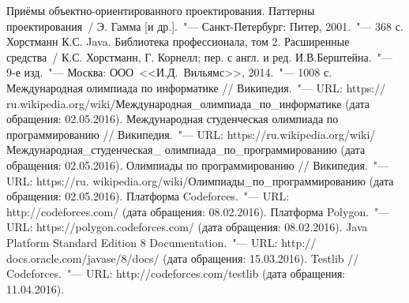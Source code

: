 \renewcommand{\bibname}{Список использованных источников}
\begin{thebibliography}{9}
 Приёмы объектно-ориентированного проектирования. Паттерны проектирования~/ Э. Гамма [и др.].~"--- Санкт-Петербург: Питер, 2001.~"--- 368 с.
 Хорстманн К.С. Java. Библиотека профессионала, том 2. Расширенные средства~/ К.С. Хорстманн, Г. Корнелл; пер. с англ. и ред. И.В.Берштейна.~"--- 9-е изд.~"--- Москва: ООО~<<И.Д.~Вильямс>>, 2014.~"--- 1008 с.
 Международная олимпиада по информатике // Википедия.~"--- URL: https:// ru.wikipedia.org/wiki/Международная\_олимпиада\_по\_информатике (дата обращения: 02.05.2016).
 Международная студенческая олимпиада по программированию // Википедия.~"--- URL: https://ru.wikipedia.org/wiki/Международная\_студенческая\_ олимпиада\_по\_про\-грам\-ми\-рованию (дата обращения: 02.05.2016).
 Олимпиады по программированию // Википедия.~"--- URL: https://ru. wikipedia.org/wiki/Олимпиады\_по\_программированию (дата обращения: 02.05.2016).
 Платформа Codeforces.~"--- URL: http://codeforces.com/ (дата обращения: 08.02.2016).
 Платформа Polygon.~"--- URL: https://polygon.codeforces.com/ (дата обращения: 08.02.2016).
 Java Platform Standard Edition 8 Documentation.~"--- URL: http:// docs.oracle.com/javase/8/docs/ (дата обращения: 15.03.2016).
 Testlib // Codeforces.~"--- URL: http://codeforces.com/testlib (дата обращения: 11.04.2016).
\end{thebibliography}